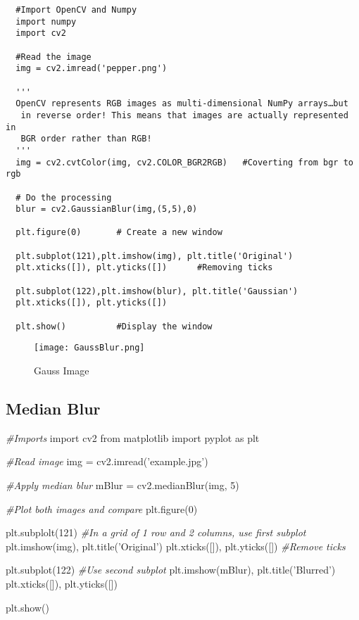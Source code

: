 \documentclass[]{article}
\newenvironment{Shaded}{}{}
\newcommand{\DecValTok}[1]{\textcolor[rgb]{0.25,0.63,0.44}{{#1}}}
\newcommand{\StringTok}[1]{\textcolor[rgb]{0.25,0.44,0.63}{{#1}}}
\newcommand{\ImportTok}[1]{{#1}}
\newcommand{\CommentTok}[1]{\textcolor[rgb]{0.38,0.63,0.69}{\textit{{#1}}}}
\newcommand{\OperatorTok}[1]{\textcolor[rgb]{0.40,0.40,0.40}{{#1}}}
\newcommand{\NormalTok}[1]{{#1}}
\begin{document}
\begin{verbatim}
  #Import OpenCV and Numpy
  import numpy
  import cv2

  #Read the image
  img = cv2.imread('pepper.png')

  '''
  OpenCV represents RGB images as multi-dimensional NumPy arrays…but
   in reverse order! This means that images are actually represented in 
   BGR order rather than RGB!
  '''
  img = cv2.cvtColor(img, cv2.COLOR_BGR2RGB)   #Coverting from bgr to rgb

  # Do the processing
  blur = cv2.GaussianBlur(img,(5,5),0)

  plt.figure(0)       # Create a new window

  plt.subplot(121),plt.imshow(img), plt.title('Original')
  plt.xticks([]), plt.yticks([])      #Removing ticks

  plt.subplot(122),plt.imshow(blur), plt.title('Gaussian')
  plt.xticks([]), plt.yticks([])

  plt.show()          #Display the window
\end{verbatim}

\begin{figure}[htbp]
\centering
\texttt{[image: GaussBlur.png]}
\caption{Gauss Image}
\end{figure}

\subsection{Median Blur}\label{median-blur-1}

\begin{Shaded}
\begin{Highlighting}[]
    \CommentTok{#Imports}
    \ImportTok{import} \NormalTok{cv2}
    \ImportTok{from} \NormalTok{matplotlib }\ImportTok{import} \NormalTok{pyplot }\ImportTok{as} \NormalTok{plt}
    
    \CommentTok{#Read image}
    \NormalTok{img }\OperatorTok{=} \NormalTok{cv2.imread(}\StringTok{'example.jpg'}\NormalTok{)}

    \CommentTok{#Apply median blur}
     \NormalTok{mBlur }\OperatorTok{=} \NormalTok{cv2.medianBlur(img, }\DecValTok{5}\NormalTok{)}

    \CommentTok{#Plot both images and compare}
    \NormalTok{plt.figure(}\DecValTok{0}\NormalTok{)}
    
    \NormalTok{plt.subplolt(}\DecValTok{121}\NormalTok{) }\CommentTok{#In a grid of 1 row and 2 columns, use first subplot}
    \NormalTok{plt.imshow(img), plt.title(}\StringTok{'Original'}\NormalTok{)}
    \NormalTok{plt.xticks([]), plt.yticks([]) }\CommentTok{#Remove ticks}

    \NormalTok{plt.subplot(}\DecValTok{122}\NormalTok{) }\CommentTok{#Use second subplot}
    \NormalTok{plt.imshow(mBlur), plt.title(}\StringTok{'Blurred'}\NormalTok{)}
    \NormalTok{plt.xticks([]), plt.yticks([])}

    \NormalTok{plt.show()}
\end{Highlighting}
\end{Shaded}
\end{document}

